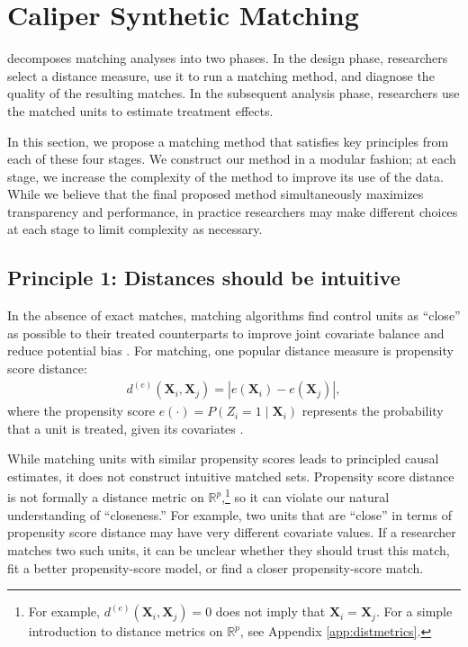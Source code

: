 \documentclass{article}
\newcommand{\bX}{\mathbf{X}}
\newcommand{\Rp}{\mathbb{R}^p}
\begin{document}
\section{Caliper Synthetic Matching}
\label{sec:CSM}

\citet{stuart2010matching} decomposes matching analyses into two phases.
In the design phase, researchers select a distance measure, use it to run a matching method, and diagnose the quality of the resulting matches.
In the subsequent analysis phase, researchers use the matched units to estimate treatment effects.

In this section, we propose a matching method that satisfies key principles from each of these four stages.
We construct our method in a modular fashion;
at each stage, we increase the complexity of the method to improve its use of the data.
While we believe that the final proposed method simultaneously maximizes transparency and performance, in practice researchers may make different choices at each stage to limit complexity as necessary.

\subsection{Principle 1: Distances should be intuitive}
\label{sec:dists}

In the absence of exact matches, matching algorithms find control units as ``close'' as possible to their treated counterparts to improve joint covariate balance and reduce potential bias \citep{rosenbaum1985bias}.
For matching, one popular distance measure is propensity score distance:
\begin{align}
\label{eq:ps}
    d^{(e)}(\bX_i, \bX_j) = |e(\bX_i) - e(\bX_j)|,
\end{align}
where the propensity score $e(\cdot) = P(Z_i = 1 \mid \bX_i)$ represents the probability that a unit is treated, given its covariates \citep{rosenbaum1983central}.

While matching units with similar propensity scores leads to principled causal estimates, it does not construct intuitive matched sets.
Propensity score distance is not formally a distance metric on $\Rp$,\footnote{For example, $d^{(e)}(\bX_i, \bX_j) = 0$ does not imply that $\bX_i = \bX_j$.
For a simple introduction to distance metrics on $\Rp$, see Appendix \ref{app:distmetrics}.}
so it can violate our natural understanding of ``closeness.''
For example, two units that are ``close'' in terms of propensity score distance may have very different covariate values.
If a researcher matches two such units, it can be unclear whether they should trust this match, fit a better propensity-score model, or find a closer propensity-score match.
\end{document}

